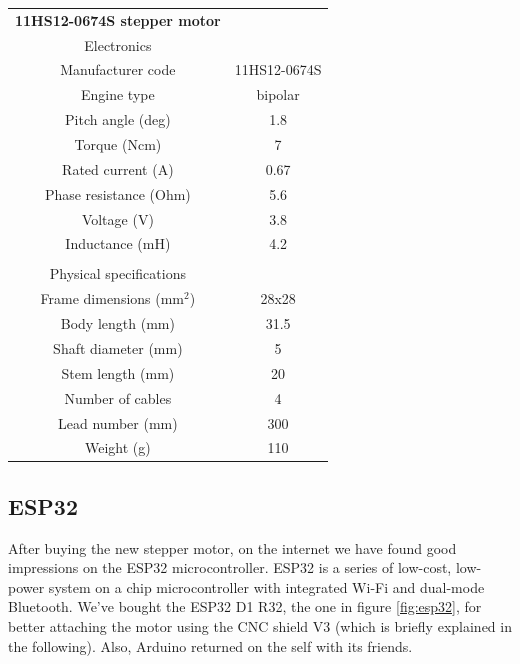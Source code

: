 \documentclass{article}
\begin{document}
\begin{multicols}{2}
        \begin{minipage}{0.5\textwidth}
            \centering
            \begin{tabular}{cc}
                \textbf{11HS12-0674S stepper motor}&\\
                Electronics&\\
                \hline
                Manufacturer code & 11HS12-0674S\\
                Engine type & bipolar\\
                Pitch angle (deg) & 1.8 \\
                Torque (Ncm)& 7\\
                Rated current (A) & 0.67\\
                Phase resistance (Ohm)& 5.6\\
                Voltage (V)& 3.8\\
                Inductance (mH)& 4.2\\
                 & \\
                Physical specifications&\\
                \hline
                Frame dimensions (mm\(^2\))& 28x28 \\
                Body length (mm)& 31.5 \\
                Shaft diameter (mm)& 5 \\
                Stem length (mm)& 20 \\
                Number of cables & 4\\
                Lead number (mm)& 300 \\
                Weight (g) & 110\\
                \hline
            \end{tabular}
            \label{tab:nema_11_specifics}
        \end{minipage}

        \subsection{ESP32}
        After buying the new stepper motor, on the internet we have found good impressions on the ESP32 microcontroller.
        ESP32 is a series of low-cost, low-power system on a chip microcontroller with integrated Wi-Fi and dual-mode Bluetooth.
        We've bought the ESP32 D1 R32, the one in figure \ref{fig:esp32}, for better attaching the motor using the CNC shield V3 (which is briefly explained in the following).
        Also, Arduino returned on the self with its friends.


\end{multicols}
\end{document}
